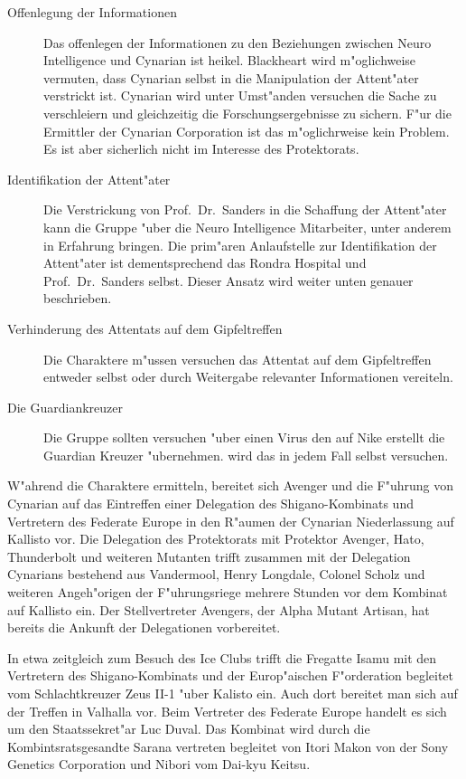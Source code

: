 \begin{description}
	\item[Offenlegung der Informationen] Das offenlegen der Informationen zu den Beziehungen zwischen Neuro Intelligence und Cynarian 		
		ist heikel. Blackheart wird m"oglichweise vermuten, dass Cynarian selbst in die Manipulation der Attent"ater verstrickt ist. Cynarian wird unter Umst"anden versuchen die Sache zu verschleiern und gleichzeitig die Forschungsergebnisse zu 	sichern. F"ur die Ermittler der Cynarian Corporation ist das m"oglichrweise kein Problem. Es ist aber sicherlich nicht im Interesse des Protektorats.
	\item[Identifikation der Attent"ater] Die Verstrickung von Prof.~Dr.~Sanders in die Schaffung der Attent"ater kann die Gruppe "uber 	
		die Neuro Intelligence Mitarbeiter, unter anderem \ml{} in Erfahrung bringen. Die prim"aren Anlaufstelle zur Identifikation der Attent"ater ist dementsprechend das Rondra Hospital und Prof.~Dr.~Sanders selbst. Dieser Ansatz wird weiter unten genauer beschrieben.
	\item[Verhinderung des Attentats auf dem Gipfeltreffen] Die Charaktere m"ussen versuchen das Attentat auf dem Gipfeltreffen entweder 
		selbst oder durch Weitergabe relevanter Informationen vereiteln.
	\item[Die Guardiankreuzer] Die Gruppe sollten versuchen "uber einen Virus den \ml{} auf Nike erstellt die Guardian Kreuzer 
		"ubernehmen. \xl{} wird das in jedem Fall selbst versuchen.
\end{description}


W"ahrend die Charaktere ermitteln, bereitet sich Avenger und die F"uhrung von Cynarian auf das Eintreffen einer Delegation des Shigano-Kombinats und Vertretern des Federate Europe in den R"aumen der Cynarian Niederlassung auf Kallisto vor. Die Delegation des Protektorats mit Protektor Avenger, Hato, Thunderbolt und weiteren Mutanten trifft zusammen mit der Delegation Cynarians bestehend aus Vandermool, Henry Longdale, Colonel Scholz und weiteren Angeh"origen der F"uhrungsriege mehrere Stunden vor dem Kombinat auf Kallisto ein. Der Stellvertreter Avengers, der Alpha Mutant Artisan, hat bereits die Ankunft der Delegationen vorbereitet.

In etwa zeitgleich zum Besuch des Ice Clubs trifft die Fregatte Isamu mit den Vertretern des Shigano-Kombinats und der Europ"aischen F"orderation begleitet vom Schlachtkreuzer Zeus II-1 "uber Kalisto ein. Auch dort bereitet man sich auf der Treffen in Valhalla vor.
Beim Vertreter des Federate Europe handelt es sich um den Staatssekret"ar Luc Duval. Das Kombinat wird durch die Kombintsratsgesandte Sarana vertreten begleitet von Itori Makon von der Sony Genetics Corporation und Nibori vom Dai-kyu Keitsu.

